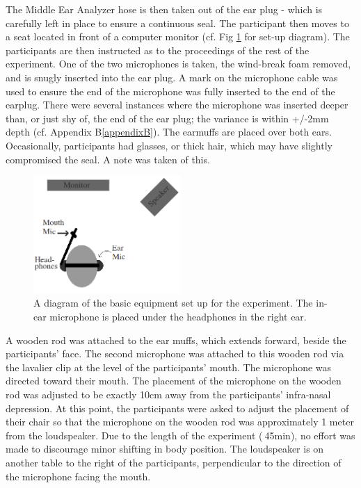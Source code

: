 \documentclass[dissertation,copyright]{uathesis}
\begin{document}
The Middle Ear Analyzer hose is then taken out of the ear plug - which is carefully left in place to ensure a continuous seal.  The participant then moves to a seat located in front of a computer monitor (cf. Fig \ref{fig:overallSetUp} for set-up diagram).  The participants are then instructed as to the proceedings of the rest of the experiment. One of the two microphones is taken, the wind-break foam removed, and is snugly inserted into the ear plug.  A mark on the microphone cable was used to ensure the end of the microphone was fully inserted to the end of the earplug.  There were several instances where the microphone was inserted deeper than, or just shy of, the end of the ear plug; the variance is within +/-2mm depth (cf. Appendix B\ref{appendixB}).  The earmuffs are placed over both ears.  Occasionally, participants had glasses, or thick hair, which may have slightly compromised the seal.  A note was taken of this. 

\begin{figure}
\includegraphics[width=0.5\textwidth]{figure/overallSetUp.png}
\caption{A diagram of the basic equipment set up for the experiment.  The in-ear microphone is placed under the headphones in the right ear.}
\label{fig:overallSetUp}
\end{figure}

A wooden rod was attached to the ear muffs, which extends forward, beside the participants' face.  The second microphone was attached to this wooden rod via the lavalier clip at the level of the participants' mouth.  The microphone was directed toward their mouth. %
The placement of the microphone on the wooden rod was adjusted to be exactly 10cm away from the participants' infra-nasal depression.  At this point, the participants were asked to adjust the placement of their chair so that the microphone on the wooden rod was approximately 1 meter from the loudspeaker. Due to the length of the experiment ($~$45min), no effort was made to discourage minor shifting in body position.  The loudspeaker is on another table to the right of the participants, perpendicular to the direction of the microphone facing the mouth.
\end{document}
